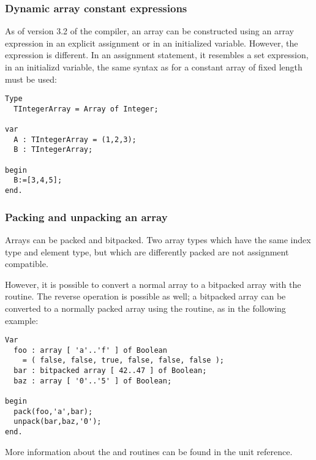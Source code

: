 \subsubsection{Dynamic array constant expressions}
As of version 3.2 of the compiler, an array can be constructed using an
array expression in an explicit assignment or in an initialized variable.
However, the expression is different. In an assignment statement, it
resembles a set expression, in an initializd variable, the same syntax as
for a constant array of fixed length must be used:
\begin{verbatim}
Type
  TIntegerArray = Array of Integer;

var
  A : TIntegerArray = (1,2,3);
  B : TIntegerArray;

begin
  B:=[3,4,5];
end.
\end{verbatim}


\subsubsection{Packing and unpacking an array}
Arrays can be packed and bitpacked. Two array types which have the same index
type and element type, but which are differently packed are not assignment
compatible.

However, it is possible to convert a normal array to a bitpacked array with the
 routine. The reverse operation is possible as well; a bitpacked
array can be converted to a normally packed array using the 
routine, as in the following example:
\begin{verbatim}
Var
  foo : array [ 'a'..'f' ] of Boolean
    = ( false, false, true, false, false, false );
  bar : bitpacked array [ 42..47 ] of Boolean;
  baz : array [ '0'..'5' ] of Boolean;

begin
  pack(foo,'a',bar);
  unpack(bar,baz,'0');
end.
\end{verbatim}
More information about the  and  routines can be found in the
 unit reference.

%
